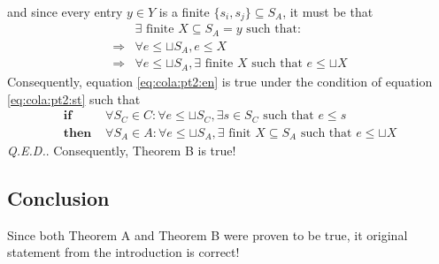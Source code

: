 and since every entry $y \in Y$ is a finite $\{s_i,s_j\} \subseteq S_A$, it must be that
\begin{align}
						& \exists \text{ finite } X \subseteq S_A = y \text{ such that:} \\
\Rightarrow	&	\forall e \leq \sqcup S_A, e \leq X \\
\Rightarrow & \forall e \leq \sqcup S_A, \exists \text{ finite } X \text{ such that } e \leq \sqcup X
\end{align}
Consequently, equation \ref{eq:cola:pt2:en} is true under the condition of equation \ref{eq:cola:pt2:st} such that
\begin{align}
	\textbf{if }		& \forall S_C \in C: \forall e \leq \sqcup S_C,
										\exists s \in S_C \text{ such that } e \leq s \\
	\textbf{then }	& \forall S_A \in A: \forall e \leq \sqcup S_A,
										\exists \text{ finit } X \subseteq S_A \text{ such that } e \leq \sqcup X
\end{align}
\emph{Q.E.D.}. Consequently, Theorem B is true!

\subsection{Conclusion}
Since both Theorem A and Theorem B were proven to be true, it original statement from the introduction is correct!